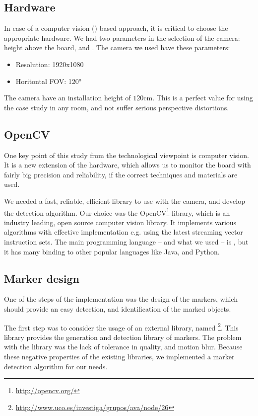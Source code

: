 \subsection{Hardware}
\label{sec:case_study:hardware}

In case of a computer vision () based approach, it is critical to choose the appropriate hardware. We had two parameters in the selection of the camera: height above the board, and . The camera we used have these parameters:
\begin{itemize}
	\item Resolution: 1920x1080
	\item Horitontal FOV: \ang{120}
\end{itemize}

The camera have an installation height of $120$\si{\centi\meter}. This is a perfect value for using the case study in any room, and not suffer serious perspective distortions.

\subsection{OpenCV}

One key point of this study from the technological viewpoint is computer vision. It is a new extension of the hardware, which allows us to monitor the board with fairly big precision and reliability, if the correct techniques and materials are used.

We needed a fast, reliable, efficient library to use with the camera, and develop the detection algorithm. Our choice was the OpenCV\footnote{\url{http://opencv.org/}} library, which is an industry leading, open source computer vision library. It implements various algorithms with effective implementation e.g. using the latest streaming vector instruction sets. The main programming language -- and what we used -- is , but it has many binding to other popular languages like Java, and Python.

\subsection{Marker design}

One of the steps of the  implementation was the design of the markers, which should provide an easy detection, and identification of the marked objects.

The first step was to consider the usage of an external library, named \footnote{\url{http://www.uco.es/investiga/grupos/ava/node/26}}. This library provides the generation and detection library of markers. The problem with the library was the lack of tolerance in quality, and motion blur. Because these negative properties of the existing libraries, we implemented a marker detection algorithm for our needs.

